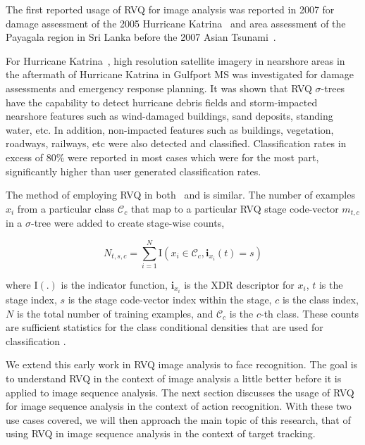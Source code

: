 \begin{Body}
The first reported usage of RVQ for image analysis was reported in 2007 for damage assessment of the 2005 Hurricane Katrina~\cite{2007_JNL_Katrina_Barnes} and area assessment of the Payagala region in Sri Lanka before the 2007 Asian Tsunami~\cite{2007_JNL_IDDM_Barnes}.    

For Hurricane Katrina~\cite{2007_JNL_Katrina_Barnes}, high resolution satellite imagery in nearshore areas in the aftermath of Hurricane Katrina in Gulfport MS was investigated for damage assessments and emergency response planning.  It was shown that RVQ $\sigma$-trees have the capability to detect hurricane debris fields and storm-impacted nearshore features such as wind-damaged buildings, sand deposits, standing water, etc.  In addition, non-impacted features such as buildings, vegetation, roadways, railways, etc were also detected and classified.  Classification rates in excess of 80\% were reported in most cases which were for the most part, significantly higher than user generated classification rates. 

The method of employing RVQ in both~\cite{2007_JNL_Katrina_Barnes} and \cite{2007_JNL_IDDM_Barnes} is similar.  The number of examples $x_i$ from a particular class $\mathcal{C}_c$ that map to a particular RVQ stage code-vector $m_{t,c}$ in a $\sigma$-tree were added to create stage-wise counts,

\begin{equation}
N_{t,s,c} = \sum\limits_{i=1}^N\mathrm{I}(x_i \in \mathcal{C}_c, \mathbf{i}_{x_i}(t)=s)
\end{equation}

where $\mathrm{I}(.)$ is the indicator function, $\mathbf{i}_{x_i}$ is the XDR descriptor for $x_i$, $t$ is the stage index, $s$ is the stage code-vector index within the stage, $c$ is the class index, $N$ is the total number of training examples, and $\mathcal{C}_c$ is the $c$-th class.  These counts are sufficient statistics for the class conditional densities that are used for classification \cite{1993_BOOK_SSP_Kay}.

We extend this early work in RVQ image analysis to face recognition.  The goal is to understand RVQ in the context of image analysis a little better before it is applied to image sequence analysis.  The next section discusses the usage of RVQ for image sequence analysis in the context of action recognition.  With these two use cases covered, we will then approach the main topic of this research, that of using RVQ in image sequence analysis in the context of target tracking.


\end{Body}
